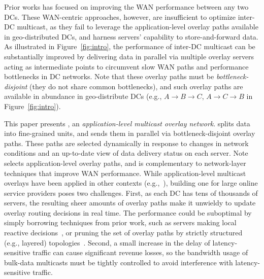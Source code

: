Prior works has focused on improving the WAN performance
between any two DCs. These WAN-centric approaches, however, are insufficient to
optimize inter-DC multicast, as they fail to leverage
the application-level overlay paths available in
geo-distributed DCs, and harness servers' capability to
store-and-forward data.
As illustrated in Figure~\ref{fig:intro}, the performance of
inter-DC multicast can be substantially improved by
delivering data in parallel via multiple overlay servers
acting as intermediate points to circumvent slow WAN paths and
performance bottlenecks in DC networks.
Note that these overlay paths must be {\em bottleneck-disjoint} (they do
not share common bottlenecks), and
such overlay paths are available in abundance in
geo-distribute DCs (e.g., $A$$\rightarrow$$B$$\rightarrow$$C$,
$A$$\rightarrow$$C$$\rightarrow$$B$ in Figure~\ref{fig:intro}).




This paper presents {\em \name}, an {\em application-level
multicast overlay network}.
\name splits data into fine-grained
units, and sends them in parallel via bottleneck-disjoint
overlay paths. These paths are selected dynamically in response to changes in
network conditions and an up-to-date view
of data delivery status on each server.
Note \name selects application-level overlay paths, and is
complementary to network-layer techniques that
improve WAN performance.
While application-level multicast overlays have been applied
in other contexts
(e.g.,~\cite{Liebeherr2002Application,Wang2007mTreebone,
Andreev2013Designing,Mokhtarian2015Minimum}), building one
for large online service providers poses two
challenges.
First, as each DC has tens of thousands of servers, the
resulting sheer amounts of overlay paths make it
unwieldy to update overlay routing decisions in real time.
The performance could be suboptimal by simply borrowing techniques
from prior work, such as servers making local reactive
decisions~\cite{kostic2003bullet,Repantis2010Scaling,Huang2014A},
or pruning the set of overlay paths by strictly
structured (e.g., layered) topologies~\cite{Nygren2010The}.
Second, a small increase in the delay of latency-sensitive traffic
can cause significant revenue losses, so the bandwidth usage
of bulk-data multicasts must be tightly controlled
to avoid interference with latency-sensitive
traffic.

